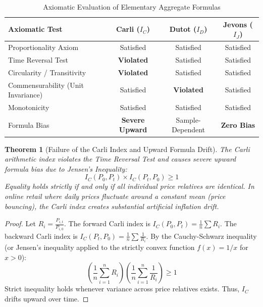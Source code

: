 \documentclass[11pt,a4paper,oneside]{article}
\newtheorem{theorem}{Theorem}[section]
\begin{document}
\begin{table}[h]
\centering
\small
\caption{Axiomatic Evaluation of Elementary Aggregate Formulas}
\begin{tabular}{lccc}
\toprule
\textbf{Axiomatic Test} & \textbf{Carli ($I_C$)} & \textbf{Dutot ($I_D$)} & \textbf{Jevons ($I_J$)} \\
\midrule
Proportionality Axiom & Satisfied & Satisfied & Satisfied \\
Time Reversal Test & \textbf{Violated} & Satisfied & Satisfied \\
Circularity / Transitivity & \textbf{Violated} & Satisfied & Satisfied \\
Commensurability (Unit Invariance) & Satisfied & \textbf{Violated} & Satisfied \\
Monotonicity & Satisfied & Satisfied & Satisfied \\
Formula Bias & \textbf{Severe Upward} & Sample-Dependent & \textbf{Zero Bias} \\
\bottomrule
\end{tabular}
\end{table}

\begin{theorem}[Failure of the Carli Index and Upward Formula Drift]
The Carli arithmetic index violates the Time Reversal Test and causes severe upward formula bias due to Jensen's Inequality:
\begin{equation}
I_C(P_0, P_t) \times I_C(P_t, P_0) \ge 1
\end{equation}
Equality holds strictly if and only if all individual price relatives are identical. In online retail where daily prices fluctuate around a constant mean (price bouncing), the Carli index creates substantial artificial inflation drift.
\end{theorem}

\begin{proof}
Let $R_i = \frac{P_{i,t}}{P_{i,0}}$. The forward Carli index is $I_C(P_0, P_t) = \frac{1}{n}\sum R_i$. The backward Carli index is $I_C(P_t, P_0) = \frac{1}{n}\sum \frac{1}{R_i}$. By the Cauchy-Schwarz inequality (or Jensen's inequality applied to the strictly convex function $f(x) = 1/x$ for $x > 0$):
\begin{equation}
\left( \frac{1}{n} \sum_{i=1}^n R_i \right) \left( \frac{1}{n} \sum_{i=1}^n \frac{1}{R_i} \right) \ge 1
\end{equation}
Strict inequality holds whenever variance across price relatives exists. Thus, $I_C$ drifts upward over time.
\end{proof}
\end{document}
